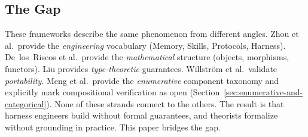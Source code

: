 \subsection{The Gap}

These frameworks describe the same phenomenon from different angles. Zhou et al.\ provide the \emph{engineering} vocabulary (Memory, Skills, Protocols, Harness). De~los~Riscos et al.\ provide the \emph{mathematical} structure (objects, morphisms, functors). Liu provides \emph{type-theoretic} guarantees. Willstr{\"o}m et al.\ validate \emph{portability}. Meng et al.\ provide the \emph{enumerative} component taxonomy and explicitly mark compositional verification as open (Section~\ref{sec:enumerative-and-categorical}). None of these strands connect to the others. The result is that harness engineers build without formal guarantees, and theorists formalize without grounding in practice. This paper bridges the gap.
